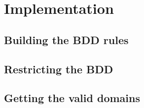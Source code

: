 \section{Implementation}
\label{Implementation}

\subsection{Building the BDD rules}

\subsection{Restricting the BDD}

\subsection{Getting the valid domains}